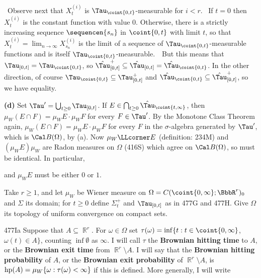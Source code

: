 {\medskip

\qquad\grheadc\ Observe next that $X^{(i)}_t$ is
$\Tau_{\coint{0,t}}$-measurable for $i<r$.    \Prf\ If $t=0$ then
$X^{(i)}_t$ is the constant function with value $0$.
Otherwise, there is a strictly
increasing sequence $\sequencen{s_n}$ in $\coint{0,t}$ with limit $t$, so
that $X^{(i)}_t=\lim_{n\to\infty}X^{(i)}_{s_n}$ is the limit of a sequence
of $\Tau_{\coint{0,t}}$-measurable functions and is itself
$\Tau_{\coint{0,t}}$-measurable.\ \QeD\   But this means that
$\Tau_{[0,t]}=\Tau_{\coint{0,t}}$, so
$\hat\Tau_{[0,t]}^+\subseteq\hat\Tau_{[0,t]}=\hat\Tau_{\coint{0,t}}$.
In the other direction, of course
$\Tau_{\coint{0,t}}\subseteq\Tau_{[0,t]}^+$ and
$\hat\Tau_{\coint{0,t}}\subseteq\hat\Tau_{[0,t]}^+$, so we have equality.

\medskip

{\bf (d)} Set $\Tau'=\bigcup_{t\ge 0}\Tau_{[0,t]}$.
If $E\in\bigcap_{t\ge 0}\hat\Tau_{\coint{t,\infty}}$, then
$\mu_W(E\cap F)=\mu_WE\cdot\mu_WF$ for every $F\in\Tau'$.   By the
Monotone Class Theorem again, $\mu_W(E\cap F)=\mu_WE\cdot\mu_WF$ for every
$F$ in the $\sigma$-algebra
generated by $\Tau'$, which is $\Cal B(\Omega)$, by (a).
Now $\mu_W\LLcorner E$ (definition:  234M) and
$(\mu_WE)\mu_W$
are Radon measures on $\Omega$ (416S) which agree on $\Cal B(\Omega)$, so
must be identical.   In particular,


\noindent and $\mu_WE$ must be either $0$ or $1$.
}%

 Take $r\ge 1$, and let
$\mu_W$ be Wiener measure on $\Omega=C(\coint{0,\infty};\BbbR^r)_0$ and
$\Sigma$ its domain;
for $t\ge 0$ define $\Sigma^+_t$ and $\Tau_{[0,t]}$ as in 477G and 477H.
Give $\Omega$ its topology of uniform convergence on compact sets.

\spheader 477Ia Suppose that $A\subseteq\BbbR^r$.
For $\omega\in\Omega$ set
$\tau(\omega)=\inf\{t:t\in\coint{0,\infty}$, $\omega(t)\in A\}$, counting
$\inf\emptyset$ as $\infty$.
I will call $\tau$ the {\bf Brownian hitting time}
to $A$, or the {\bf Brownian exit time} from $\BbbR^r\setminus A$.
I will say that the {\bf Brownian hitting probability} of $A$, or
the {\bf Brownian exit probability} of $\BbbR^r\setminus A$, is
$\mathop{\text{hp}}\nolimits(A)=\mu_W\{\omega:\tau(\omega)<\infty\}$ if this is defined.
More generally, I will write

